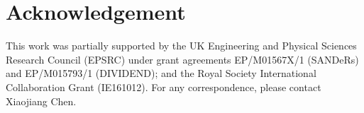 \section{Acknowledgement}
This work was partially supported by the UK Engineering and Physical Sciences Research Council (EPSRC) under grant agreements EP/M01567X/1
(SANDeRs) and EP/M015793/1 (DIVIDEND); and the Royal Society International Collaboration Grant (IE161012). For any correspondence, please
contact Xiaojiang Chen. 
